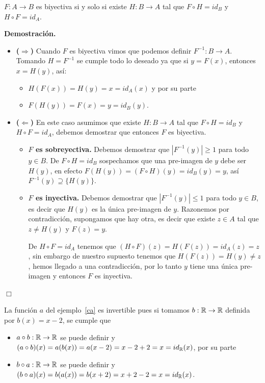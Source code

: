 \begin{thm}
$F:A\rightarrow B$ es biyectiva si y solo si existe $H:B\rightarrow A$ tal que $F\circ H=id_B$ y $H\circ F=id_A$.\\
\end{thm}
{\bf Demostración.}
\begin{itemize}
\item  {\bf ($\Rightarrow$)} Cuando $F$ es biyectiva vimos que podemos definir $F^{-1}:B\rightarrow A$.
 Tomando $H=F^{-1}$ se cumple todo lo deseado ya que si $y=F(x)$, entonces $x=H(y)$, así: 
 \begin{itemize}
 \item $H(F(x))=H(y)=x=id_A(x)$ y por su parte 
 \item $F(H(y))=F(x)=y=id_B(y)$.
 \end{itemize}
 \item  {\bf ($\Leftarrow$)} En este caso asumimos que existe $H:B\rightarrow A$ tal que $F\circ H=id_B$ y $H\circ F=id_A$, debemos demostrar que entonces $F$ es biyectiva.
\begin{itemize}
\item {\bf $F$ es sobreyectiva.} Debemos demostrar que $|F^{-1}(y)|\ge 1$ para todo $y\in B$.
De $F\circ H=id_B$ sospechamos que una pre-imagen de $y$ debe ser $H(y)$, en efecto $F(H(y))=(F\circ H)(y)=id_B(y)=y$, así $F^{-1}(y)\supseteq\{H(y)\}$.
\item {\bf $F$ es inyectiva.} Debemos demostrar que  $|F^{-1}(y)|\le 1$ para todo $y\in B$, es decir que $H(y)$ es la única pre-imagen de $y$. Razonemos por contradicción, supongamos que hay otra, es decir que existe $z\in A$ tal que $z\not =H(y)$ y $F(z)=y$.

De $H\circ F=id_A$ tenemos que $(H\circ F)(z)=H(F(z))=id_A(z)=z$, sin embargo de nuestro supuesto tenemos que  $H(F(z))=H(y)\not=z$, hemos llegado a una contradicción, por lo tanto $y$ tiene una única pre-imagen y entonces $F$ es inyectiva.
\end{itemize}
\end{itemize}
\hfill $\Box$

\begin{ejemplo}
La función $a$ del ejemplo~\ref{ca} es invertible pues si tomamos $b:\mathbb{R}\rightarrow \mathbb{R}$ definida por $b(x)=x-2$, se cumple que 
\begin{itemize}
\item $a\circ b:\mathbb{R}\rightarrow\mathbb{R}$ se puede definir y $(a\circ b)(x)=a(b(x))=a(x-2)=x-2+2=x=id_{\mathbb{R}}(x)$, por su parte
\item $b\circ a:\mathbb{R}\rightarrow\mathbb{R}$ se puede definir y $(b\circ a)(x)=b(a(x))=b(x+2)=x+2-2=x=id_{\mathbb{R}}(x)$.
\end{itemize}
\end{ejemplo}


